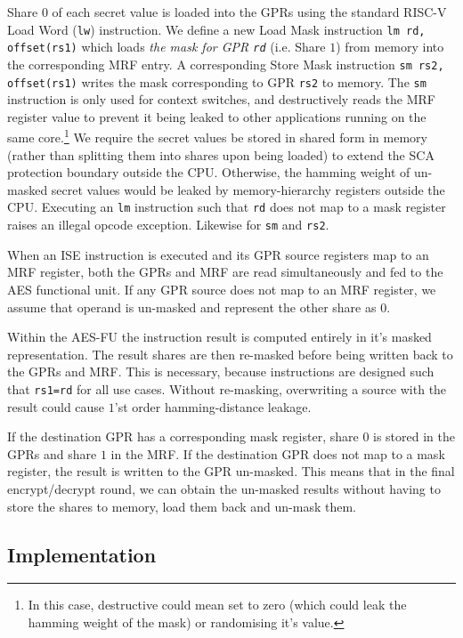 Share $0$ of each secret value is loaded into the GPRs using the
standard RISC-V Load Word ({\tt lw}) instruction.
We define a new Load Mask instruction {\tt lm rd, offset(rs1)} which
loads {\em the mask for GPR {\tt rd}}
(i.e. Share $1$)
from memory into the corresponding MRF entry.
A corresponding Store Mask instruction {\tt sm rs2, offset(rs1)} writes
the mask corresponding to GPR {\tt rs2} to memory.
The {\tt sm} instruction is only used for context switches, and
destructively reads the MRF register value to prevent it being
leaked to other applications running on the same core.\footnote{
    In this case, destructive could mean set to zero (which could
    leak the hamming weight of the mask) or randomising it's value.}
We require the secret values be stored in shared form in memory
(rather than splitting them into shares upon being loaded)
to extend the SCA protection boundary outside the CPU.
Otherwise, the hamming weight of un-masked secret values would be
leaked by memory-hierarchy registers outside the CPU.
Executing an {\tt lm} instruction such that {\tt rd} does not map to
a mask register raises an illegal opcode exception.
Likewise for {\tt sm} and {\tt rs2}.

When an ISE instruction is executed and its GPR source
registers map to an MRF register, both the GPRs and MRF are
read simultaneously and fed to the AES functional unit.
If any GPR source does not map to an MRF register, we assume that
operand is un-masked and represent the other share as $0$.

Within the AES-FU the instruction result is computed entirely in it's
masked representation.
The result shares are then re-masked before being written back to the
GPRs and MRF.
This is necessary, because  instructions are designed
such that {\tt rs1=rd} for all use cases.
Without re-masking, overwriting a source with the result could cause 
$1$'st order hamming-distance leakage.

If the destination GPR has a corresponding
mask register, share $0$ is stored in the GPRs and share $1$ in the MRF.
If the destination GPR does not map to a mask register, the result is written
to the GPR un-masked.
This means that in the final encrypt/decrypt round, we can obtain
the un-masked results without having to store the shares to memory,
load them back and un-mask them.

\subsection{Implementation}

